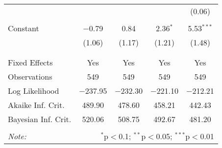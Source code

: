 \begin{table}[!htbp]
\begin{tabular}{@{\extracolsep{5pt}}lcccc}
  &  &  &  & (0.06) \\ 
  & & & & \\ 
 Constant & $-$0.79 & 0.84 & 2.36$^{*}$ & 5.53$^{***}$ \\ 
  & (1.06) & (1.17) & (1.21) & (1.48) \\ 
  & & & & \\ 
\hline \\[-1.8ex] 
Fixed Effects & Yes & Yes & Yes & Yes \\ 
Observations & 549 & 549 & 549 & 549 \\ 
Log Likelihood & $-$237.95 & $-$232.30 & $-$221.10 & $-$212.21 \\ 
Akaike Inf. Crit. & 489.90 & 478.60 & 458.21 & 442.43 \\ 
Bayesian Inf. Crit. & 520.06 & 508.75 & 492.67 & 481.20 \\ 
\hline 
\hline \\[-1.8ex] 
\textit{Note:}  & \multicolumn{4}{r}{$^{*}$p$<$0.1; $^{**}$p$<$0.05; $^{***}$p$<$0.01} \\ 
\end{tabular} 
\end{table} 
